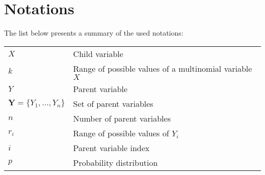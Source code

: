 \documentclass[11pt, oneside]{article}   	%
\numberwithin{figure}{section}
\numberwithin{equation}{section}
\numberwithin{table}{section}
\begin{document}

\newpage
\section*{Notations}

The list below presents a summary of the used notations:
\\

\begin{table}[ht!]
\renewcommand{\arraystretch}{1.1}
{\small
\begin{tabular}{l l}
$X$ & Child variable\\
$k$& Range of possible values of a multinomial variable $X$\\
$Y$ & Parent variable\\
$\mathbf{Y} = \{Y_1,\ldots,Y_n\}$ & Set of parent variables\\
$n$& Number of parent variables \\
$r_i$& Range of possible values of $Y_i$\\
$i$ & Parent variable index \\
$p$ & Probability distribution\\
\end{tabular}}
\end{table}
\end{document}
